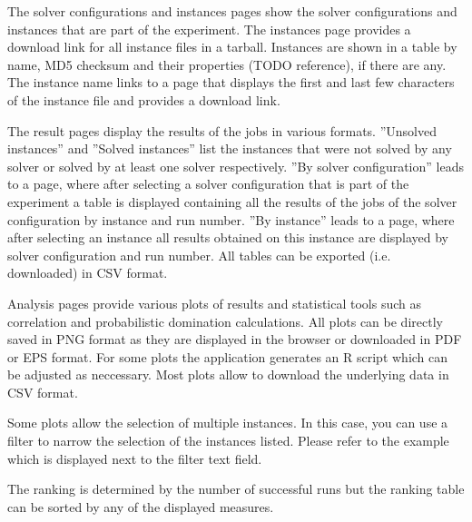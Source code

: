 The solver configurations and instances pages show the solver configurations and instances that are part of the experiment. The instances page provides a download link
for all instance files in a tarball.
Instances are shown in a table by name, MD5 checksum and their properties (TODO reference), if there are any. The instance name links to a page that displays the 
first and last few characters of the instance file and provides a download link.

The result pages display the results of the jobs in various formats. ''Unsolved instances'' and ''Solved instances'' list the instances that
were not solved by any solver or solved by at least one solver respectively. ''By solver configuration'' leads to a page, where after selecting a solver configuration
that is part of the experiment a table is displayed containing all the results of the jobs of the solver configuration by instance and run number.
''By instance'' leads to a page, where after selecting an instance all results obtained on this instance are displayed by solver configuration and run number.
All tables can be exported (i.e. downloaded) in CSV format.

Analysis pages provide various plots of results and statistical tools such as correlation and probabilistic domination calculations. All plots can be directly saved
in PNG format as they are displayed in the browser or downloaded in PDF or EPS format. For some plots the application generates an R script which can be adjusted as
neccessary.
Most plots allow to download the underlying data in CSV format.

Some plots allow the selection of multiple instances. In this case, you can use a filter to narrow the selection of the instances listed. Please refer to the example
which is displayed next to the filter text field.

The ranking is determined by the number of successful runs but the ranking table can be sorted by any of the displayed measures.
